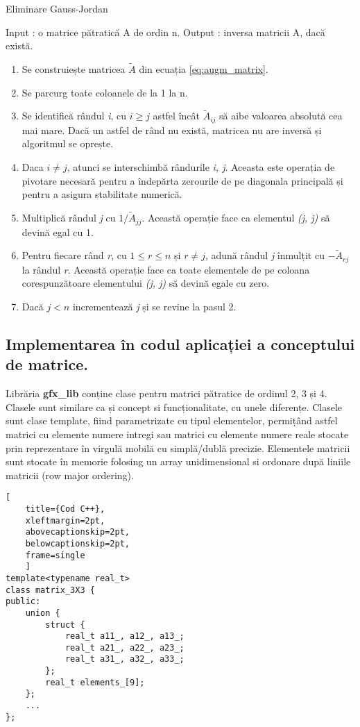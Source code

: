\begin{algorithm}
\caption{Eliminare Gauss-Jordan}
\label{alg:gauss_jordan_elim}
\begin{algorithmic}
\STATE Input : o matrice pătratică A de ordin n.
\STATE Output : inversa matricii A, dacă există.
\begin{enumerate}[{Pas} 1.]
  \item Se construiește matricea $\tilde{A}$ din ecuația \eqref{eq:augm_matrix}.
  \item Se parcurg toate coloanele de la 1 la n.
  \item Se identifică rândul \textit{i}, cu $\mathit{i \geq j}$ astfel încât
  $\tilde{A}_{ij}$ să aibe valoarea absolută cea mai mare. Dacă un astfel de
  rând nu există, matricea nu are inversă și algoritmul se oprește.
  \item Daca $\mathit{i \neq j}$, atunci se interschimbă rândurile 
  \textit{i, j}. Aceasta este operația de pivotare necesară pentru a îndepărta
  zerourile de pe diagonala principală și pentru a asigura stabilitate numerică.
  \item Multiplică rândul \textit{j} cu $1 \text{/} \tilde{A}_{jj}$. Această
  operație face ca elementul \textit{(j, j)} să devină egal cu 1.
  \item Pentru fiecare rând \textit{r}, cu $\mathit{1 \leq r \leq n}$ și $r
  \neq j$, adună rândul \textit{j} înmulțit cu $-\tilde{A}_{rj}$ la rândul
  \textit{r}. Această operație face ca toate elementele de pe coloana
  corespunzătoare elementului \textit{(j, j)} să devină egale cu zero.
  \item Dacă $\mathit{j < n}$ incrementează \textit{j} și se revine la pasul 2.
\end{enumerate}
\end{algorithmic}
\end{algorithm}

\subsection{Implementarea în codul aplicației a conceptului de matrice.}
\label{ch1:sec_matrix:sub_matrix_appcode}
\indent

Librăria \textbf{gfx\_lib} conține clase pentru matrici pătratice de ordinul 2,
3 și 4. Clasele sunt similare ca și concept si funcționalitate, cu unele diferențe. 
Clasele sunt clase template, fiind parametrizate cu tipul elementelor,
permițând astfel matrici cu elemente numere intregi sau matrici cu elemente
numere reale stocate prin reprezentare în virgulă mobilă cu simplă/dublă
precizie. Elementele matricii sunt stocate în memorie folosing un array
unidimensional si ordonare după liniile matricii (row major ordering).
\begin{lstlisting}[
    title={Cod C++}, 
    xleftmargin=2pt,
    abovecaptionskip=2pt,
    belowcaptionskip=2pt,
    frame=single
    ]
template<typename real_t>
class matrix_3X3 {
public:
    union {
        struct {
            real_t a11_, a12_, a13_;
            real_t a21_, a22_, a23_;
            real_t a31_, a32_, a33_;
        };
        real_t elements_[9];
    };
    ...
};
\end{lstlisting}


